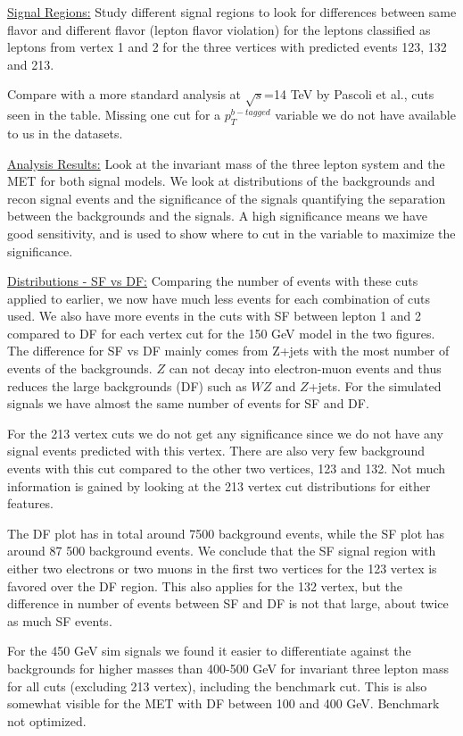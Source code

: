 \documentclass[a4paper, american, 12pt]{report}
\begin{document}
	
	\underline{Signal Regions:}
	Study different signal regions to look for differences between same flavor and different flavor (lepton flavor violation) for the leptons classified as leptons from vertex 1 and 2 for the three vertices with predicted events 123, 132 and 213. 
	
	Compare with a more standard analysis at $\sqrt{s}$=14 TeV by Pascoli et al., cuts seen in the table. Missing one cut for a $p_T^{b-tagged}$ variable we do not have available to us in the datasets.
	
	
	\underline{Analysis Results:}
	Look at the invariant mass of the three lepton system and the MET for both signal models. We look at distributions of the backgrounds and recon signal events and the significance of the signals quantifying the separation between the backgrounds and the signals. A high significance means we have good sensitivity, and is used to show where to cut in the variable to maximize the significance.
	
	
	\underline{Distributions - SF vs DF:}
	Comparing the number of events with these cuts applied to earlier, we now have much less events for each combination of cuts used. We also have more events in the cuts with SF between lepton 1 and 2 compared to DF for each vertex cut for the 150 GeV model in the two figures. The difference for SF vs DF mainly comes from Z+jets with the most number of events of the backgrounds. $Z$ can not decay into electron-muon events and thus reduces the large backgrounds (DF) such as $W$$Z$ and $Z$+jets. For the simulated signals we have almost the same number of events for SF and DF. 
	
	For the 213 vertex cuts we do not get any significance since we do not have any signal events predicted with this vertex. There are also very few background events with this cut compared to the other two vertices, 123 and 132. Not much information is gained by looking at the 213 vertex cut distributions for either features.
	
	The DF plot has in total around 7500 background events, while the SF plot has around 87 500 background events. We conclude that the SF signal region with either two electrons or two muons in the first two vertices for the 123 vertex is favored over the DF region. This also applies for the 132 vertex, but the difference in number of events between SF and DF is not that large, about twice as much SF events.
	
	For the 450 GeV sim signals we found it easier to differentiate against the backgrounds for higher masses than 400-500 GeV for invariant three lepton mass for all cuts (excluding 213 vertex), including the benchmark cut. This is also somewhat visible for the MET with DF between 100 and 400 GeV. Benchmark not optimized.
	
\end{document}
